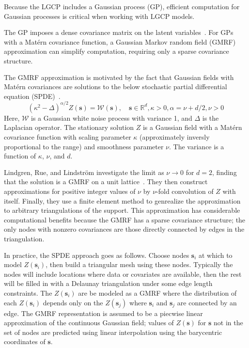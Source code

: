 \documentclass[]{interact}
\begin{document}
Because the LGCP includes a Gaussian process (GP), efficient computation for
Gaussian processes is critical when working with LGCP models.

The GP imposes a dense covariance matrix on the latent variables~\cite{rinla}.
For GPs with a Mat\'{e}rn covariance function, a Gaussian Markov random field
(GMRF) approximation can simplify computation, requiring only a sparse
covariance structure.

The GMRF approximation is motivated by the fact that Gaussian fields with
Mat\'{e}rn covariances are solutions to the below stochastic partial
differential equation (SPDE)~\cite{lindgrenetal}.
\begin{displaymath}
(\kappa^{2} - \Delta)^{\alpha / 2} Z(\mathbf{s}) = \mathcal{W}(\mathbf{s}),
\quad \mathbf{s} \in \mathbb{R}^d, \kappa > 0, \alpha = \nu + d/2, \nu > 0
\end{displaymath}
Here, \(\mathcal{W}\) is a Gaussian white noise process with variance 1, and
\(\Delta\) is the Laplacian operator. The stationary solution \(Z\) is a
Gaussian field with a Mat\'{e}rn covariance function with scaling parameter
\(\kappa\) (approximately inversly proportional to the range) and smoothness
parameter \(\nu\). The variance is a function of \(\kappa\), \(\nu\), and
\(d\).

Lindgren, Rue, and Lindstr\"{o}m investigate the limit as \(\nu \to 0\) for
\(d = 2\), finding that the solution is a GMRF on a unit
lattice~\cite{lindgrenetal}. They then construct approximations for positive
integer values of \(\nu\) by \(\nu\)-fold convolution of \(Z\) with itself.
Finally, they use a finite element method to genrealize the approximation
to arbitrary triangulations of the support. This approximation has considerable
computational benefits because the GMRF has a sparse covariance structure; the
only nodes with nonzero covariances are those directly connected by edges in
the triangulation.

In practice, the SPDE approach goes as follows. Choose nodes \(\mathbf{s}_{i}\)
at which to model \(Z(\mathbf{s}_{i})\), then build a triangular mesh using these
nodes. Typically the nodes will include locations where data or covariates are
available, then the rest will be filled in with a Delaunay triangulation under
some edge length constraints. The \(Z(\mathbf{s}_{i})\) are be modeled as a
GMRF where the distribution of each \(Z(\mathbf{s}_{i})\) depends only on the
\(Z(\mathbf{s}_{j})\) where \(\mathbf{s}_{i}\) and \(\mathbf{s}_{j}\) are
connected by an edge. The GMRF representation is assumed to be a piecwise
linear approximation of the continuous Gaussian field; values of
\(Z(\mathbf{s})\) for \(\mathbf{s}\) not in the set of nodes are predicted
using linear interpolation using the barycentric coordinates of
\(\mathbf{s}\).
\end{document}
